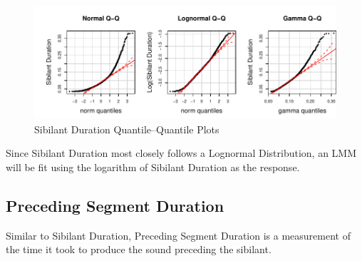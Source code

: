 \documentclass[a4paper]{article}
\begin{document}
\begin{figure}[h!]
  \begin{center}
    \begin{minipage}[t]{\linewidth}
      \begin{center}
\includegraphics{prelim-028}
      \end{center}
    \end{minipage}
    \caption{Sibilant Duration Quantile--Quantile Plots}
    \label{fig:sib_dur_qq}
  \end{center}
\end{figure}
Since Sibilant Duration most closely follows a Lognormal Distribution,
an LMM will be fit using the logarithm of Sibilant Duration as the response.

\subsection*{Preceding Segment Duration}
Similar to Sibilant Duration, Preceding Segment Duration is a
measurement of the time it took to produce the sound preceding the sibilant.
\end{document}
